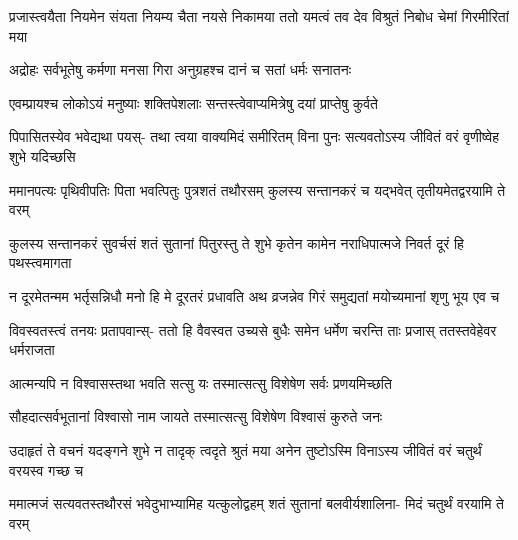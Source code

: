 


\fourlineindentedshloka
{प्रजास्त्वयैता नियमेन संयता}
{नियम्य चैता नयसे निकामया}
{ततो यमत्वं तव देव विश्रुतं}
{निबोध चेमां गिरमीरितां मया}


\twolineshloka
{अद्रोहः सर्वभूतेषु कर्मणा मनसा गिरा}
{अनुग्रहश्च दानं च सतां धर्मः सनातनः}


\twolineshloka
{एवम्प्रायश्च लोकोऽयं मनुष्याः शक्तिपेशलाः}
{सन्तस्त्वेवाप्यमित्रेषु दयां प्राप्तेषु कुर्वते}




\fourlineindentedshloka
{पिपासितस्येव भवेद्यथा पयस्-}
{तथा त्वया वाक्यमिदं समीरितम्}
{विना पुनः सत्यवतोऽस्य जीवितं}
{वरं वृणीष्वेह शुभे यदिच्छसि}




\fourlineindentedshloka
{ममानपत्यः पृथिवीपतिः पिता}
{भवत्पितुः पुत्रशतं तथौरसम्}
{कुलस्य सन्तानकरं च यद्भवेत्}
{तृतीयमेतद्वरयामि ते वरम्}




\fourlineindentedshloka
{कुलस्य सन्तानकरं सुवर्चसं}
{शतं सुतानां पितुरस्तु ते शुभे}
{कृतेन कामेन नराधिपात्मजे}
{निवर्त दूरं हि पथस्त्वमागता}




\fourlineindentedshloka
{न दूरमेतन्मम भर्तृसन्निधौ}
{मनो हि मे दूरतरं प्रधावति}
{अथ व्रजन्नेव गिरं समुद्यतां}
{मयोच्यमानां शृणु भूय एव च}


\fourlineindentedshloka
{विवस्वतस्त्वं तनयः प्रतापवान्स्-}
{ततो हि वैवस्वत उच्यसे बुधैः}
{समेन धर्मेण चरन्ति ताः प्रजास्}
{ततस्तवेहेवर धर्मराजता}


\twolineshloka
{आत्मन्यपि न विश्वासस्तथा भवति सत्सु यः}
{तस्मात्सत्सु विशेषेण सर्वः प्रणयमिच्छति}


\twolineshloka
{सौहदात्सर्वभूतानां विश्वासो नाम जायते}
{तस्मात्सत्सु विशेषेण विश्वासं कुरुते जनः}



\fourlineindentedshloka
{उदाहृतं ते वचनं यदङ्गने}
{शुभे न तादृक् त्वदृते श्रुतं मया}
{अनेन तुष्टोऽस्मि विनाऽस्य जीवितं}
{वरं चतुर्थं वरयस्व गच्छ च}




\fourlineindentedshloka
{ममात्मजं सत्यवतस्तथौरसं}
{भवेदुभाभ्यामिह यत्कुलोद्वहम्}
{शतं सुतानां बलवीर्यशालिना-}
{मिदं चतुर्थं वरयामि ते वरम्}

